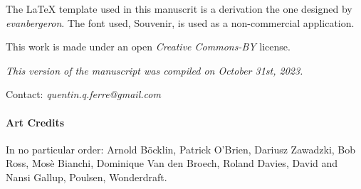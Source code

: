 The LaTeX template used in this manuscrit is a derivation the one designed by \textit{evanbergeron}. The font used, Souvenir, is used as a non-commercial application.

\vskip 0.5cm

This work is made under an open \textit{Creative Commons-BY} license. 

\textit{This version of the manuscript was compiled on October 31st, 2023.}

Contact: \textit{quentin.q.ferre@gmail.com}



\paragraph{Art Credits}

In no particular order: Arnold Böcklin, Patrick O'Brien, Dariusz Zawadzki, Bob Ross, Mosè Bianchi, Dominique Van den Broech, Roland Davies, David and Nansi Gallup, Poulsen, Wonderdraft.


